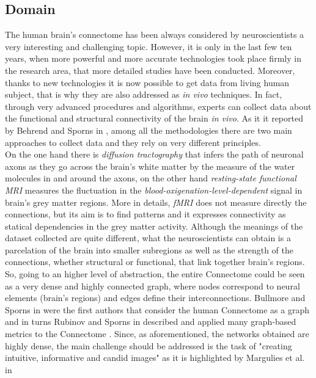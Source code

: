 \documentclass{article}
\begin{document}
\begin{multicols}{2}
\section{Domain}
\label{sec:domain}

The human brain's connectome has been always considered by neuroscientists a very interesting and challenging topic. However, it is only in the last few ten years, when more powerful and more accurate technologies took place firmly in the research area, that more detailed studies have been conducted. Moreover, thanks to new technologies it is now possible to get data from living human subject, that is why they are also addressed as \textit{in vivo} techniques. In fact, through very advanced procedures and algorithms, experts can collect data about the functional and structural connectivity of the brain \textit{in vivo}. As it it reported by Behrend and Sporns in \cite{humanConnectomics}, among all the methodologies there are two main approaches to collect data and they rely on very different principles. \\
On the one hand there is \textit{diffusion tractography} that infers the path of neuronal axons as they go across the brain's white matter by the measure of the water molecules in and around the axons, on the other hand \textit{resting-state functional MRI} measures the fluctuation in the \textit{blood-oxigenation-level-dependent} signal in brain's grey matter regions. More in details, \textit{fMRI} does not measure directly the connections, but its aim is to find patterns and it expresses connectivity as statical dependencies in the grey matter activity. Although the meanings of the dataset collected are quite different, what the neuroscientists can obtain is a parcelation of the brain into smaller subregions as well as the strength of the connections, whether structural or functional, that link together brain's regions. So, going to an higher level of abstraction, the entire Connectome could be seen as a very dense and highly connected graph, where nodes correspond to neural elements (brain's regions) and edges define their interconnections. Bullmore and Sporns in \cite{bullmore2009complex} were the first authors that consider the human Connectome as a graph and in turns Rubinov and Sporns in \cite{complexNetworkMeasures} described and applied many graph-based metrics to the Connectome . Since, as aforementioned, the networks obtained are highly dense, the main challenge should be addressed is the task of "creating intuitive, informative and candid images" as it is highlighted by Margulies et al. in \cite{visualizingHumanConnectome}


\end{multicols}
\end{document}
